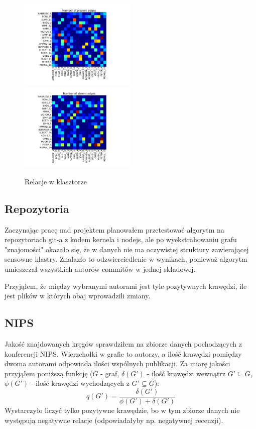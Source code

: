 \documentclass{article}
\begin{document}
\begin{figure}
\includegraphics[width=0.5\textwidth]{sampson_present.pdf}
\includegraphics[width=0.5\textwidth]{sampson_absent.pdf}
\caption{Relacje w klasztorze}
\label{sampson}
\end{figure}

\subsection{Repozytoria}
Zaczynając pracę nad projektem planowałem przetestować algorytm na repozytoriach
git-a z kodem kernela i nodejs, ale po wyekstrahowaniu grafu "znajomości" okazało
się, że w danych nie ma oczywistej struktury zawierającej sensowne klastry. Znalazło
to odzwierciedlenie w wynikach, ponieważ algorytm umieszczał wszystkich autorów
commitów w jednej składowej.

Przyjąłem, że między wybranymi autorami jest tyle pozytywnych krawędzi, ile jest
plików w których obaj wprowadzili zmiany.

\subsection{NIPS}
Jakość znajdowanych kręgów sprawdziłem na zbiorze danych pochodzących z
konferencji NIPS. Wierzchołki w grafie to autorzy, a ilość krawędzi pomiędzy
dwoma autorami odpowiada ilości wspólnych publikacji. Za miarę jakości
przyjąłem poniższą funkcję ($G$ - graf, $\delta(G')$ - ilość krawędzi wewnątrz
$G' \subseteq G$, $\phi(G')$ - ilość krawędzi wychodzących z $G' \subseteq G$):
$$q(G') = \frac{\delta(G')}{\phi(G') + \delta(G')}$$
Wystarczyło liczyć tylko pozytywne krawędzie, bo w tym zbiorze danych nie
występują negatywne relacje (odpowiadałyby np. negatywnej recenzji).
\end{document}
